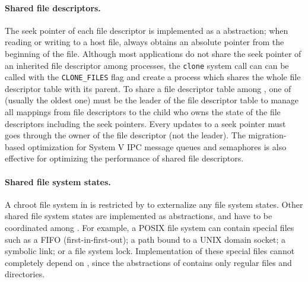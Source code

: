 \paragraph{Shared file descriptors.}
The seek pointer of each file descriptor is implemented as a \libos{} abstraction;
when reading or writing to a host file,
\thehostabi{} always obtains an absolute pointer from the beginning of the file.
Although most applications
do not share the seek pointer of an inherited file descriptor among processes,
the {\tt clone} system call
can can be called with the {\tt CLONE\_FILES} flag
and create a process
which shares the whole file descriptor table with its parent.
To share a file descriptor table among \picoprocs{},
one of \picoprocs{} (usually the oldest one)
must be the leader of the file descriptor table to manage all mappings
from file descriptors to the child \picoproc{} who owns the state of the file descriptors including the seek pointers.
Every updates to a seek pointer must goes through the owner of the file descriptor (not the leader).
The migration-based optimization for System V IPC message queues and semaphores is also effective for optimizing the performance of shared file descriptors. 

\paragraph{Shared file system states.}
A chroot file system in \thelibos{}
is restricted by \thehostabi{} to externalize any file system states.
Other shared file system states are implemented as \libos{} abstractions, and have to be coordinated among \picoprocs{}.
For example, a POSIX file system can contain special files such as a FIFO (first-in-first-out); a path bound to a UNIX domain socket;
a symbolic link; or a file system lock.
Implementation of these special files cannot
completely depend on \thehostabi{},
since the abstractions of \thehostabi{} contains only regular files and directories.

